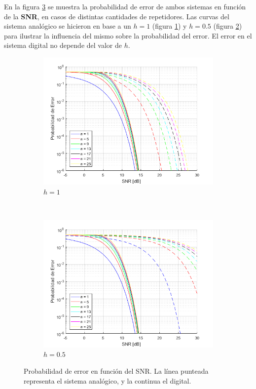 En la figura \ref{fig:prob_err} se muestra la probabilidad de error de ambos sistemas en función de la \textbf{SNR}, en casos de distintas cantidades de repetidores. Las curvas del sistema analógico se hicieron en base a un $h=1$ (figura \ref{fig:prob_err_a}) y $h=0.5$ (figura \ref{fig:prob_err_b}) para ilustrar la influencia del mismo sobre la probabilidad del error. El error en el sistema digital no depende del valor de $h$.


\begin{figure}[]
    \centering
    \begin{subfigure}[t]{0.8\textwidth}
        \centering
        \includegraphics[width=\textwidth]{./Matlab/ej3h=1.png}
        \caption{$h=1$}
        \label{fig:prob_err_a}
    \end{subfigure}%
    \\
    \begin{subfigure}[t]{0.8\textwidth}
        \centering
        \includegraphics[width=\textwidth]{./Matlab/ej3h=05.png}
        \caption{$h=0.5$}
        \label{fig:prob_err_b}
    \end{subfigure}
    \caption{Probabilidad de error en función del SNR. La línea punteada representa el sistema analógico, y la continua el digital.}
\label{fig:prob_err}
\end{figure}

